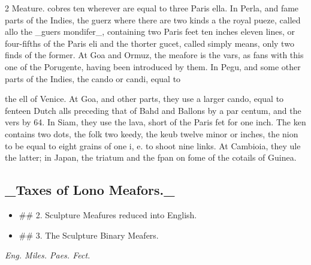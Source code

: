 \documentclass[10pt]{article}
\begin{document}
\begin{multicols}{2}\raggedcolumns
Meature. cobres ten wherever are equal to three Paris ella. In Perla, and fame parts of the Indies, the guerz where there are two kinds a the royal pueze, called allo the \_guers mondifer\_, containing two Paris feet ten inches eleven lines, or four-fifths of the Paris eli and the thorter gucet, called simply means, only two finds of the former. At Goa and Ormuz, the meafore is the vars, as fans with this one of the Porugente, having been introduced by them. In Pegu, and some other parts of the Indies, the cando or candi, equal to

the ell of Venice. At Goa, and other parts, they use a larger cando, equal to fenteen Dutch alls preceding that of Bahd and Ballons by a par centum, and the vers by 64. In Siam, they use the lava, short of the Paris fet for one inch. The ken contains two dots, the folk two keedy, the keub twelve minor or inches, the nion to be equal to eight grains of one i, e. to shoot nine links. At Cambioia, they ule the latter; in Japan, the triatum and the fpan on fome of the cotails of Guinea.

\subsection*{\_Taxes of Lono Meafors.\_}
\begin{itemize}\setlength{\itemsep}{1pt}
\item \#\# 2. Sculpture Meafures reduced into English.
\item \#\# 3. The Sculpture Binary Meafers.
\end{itemize}
\begin{center}\small\itshape Eng. Miles. Paes. Fect.\end{center}
\end{multicols}
\end{document}
